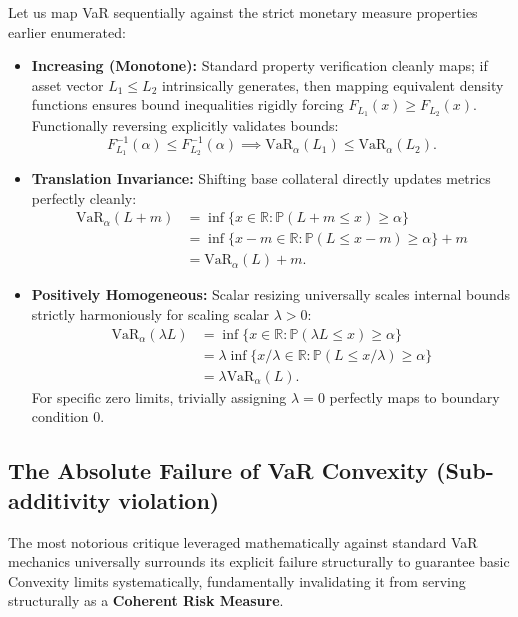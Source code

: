 Let us map VaR sequentially against the strict monetary measure properties earlier enumerated:

\begin{itemize}
    \item \textbf{Increasing (Monotone):} Standard property verification cleanly maps; if asset vector $L_1 \leq L_2$ intrinsically generates, then mapping equivalent density functions ensures bound inequalities rigidly forcing $F_{L_1}(x) \geq F_{L_2}(x)$. Functionally reversing explicitly validates bounds:
    $$
    F_{L_1}^{-1}(\alpha) \leq F_{L_2}^{-1}(\alpha) \implies \text{VaR}_\alpha(L_1) \leq \text{VaR}_\alpha(L_2).
    $$
    \item \textbf{Translation Invariance:} Shifting base collateral directly updates metrics perfectly cleanly:
    \begin{align*}
        \text{VaR}_\alpha(L + m) &= \inf \{x \in \mathbb{R} : \mathbb{P}(L + m \leq x) \geq \alpha\} \\
        &= \inf \{x - m \in \mathbb{R} : \mathbb{P}(L \leq x - m) \geq \alpha\} + m \\
        &= \text{VaR}_\alpha(L) + m.
    \end{align*}
    \item \textbf{Positively Homogeneous:} Scalar resizing universally scales internal bounds strictly harmoniously for scaling scalar $\lambda > 0$:
    \begin{align*}
        \text{VaR}_\alpha(\lambda L) &= \inf \{x \in \mathbb{R} : \mathbb{P}(\lambda L \leq x) \geq \alpha\} \\
        &= \lambda \inf \{x/\lambda \in \mathbb{R} : \mathbb{P}(L \leq x/\lambda) \geq \alpha\} \\
        &= \lambda \text{VaR}_\alpha(L).
    \end{align*}
    For specific zero limits, trivially assigning $\lambda = 0$ perfectly maps to boundary condition $0$.
\end{itemize}

\subsection{The Absolute Failure of VaR Convexity (Sub-additivity violation)}

The most notorious critique leveraged mathematically against standard VaR mechanics universally surrounds its explicit failure structurally to guarantee basic Convexity limits systematically, fundamentally invalidating it from serving structurally as a \textbf{Coherent Risk Measure}.

